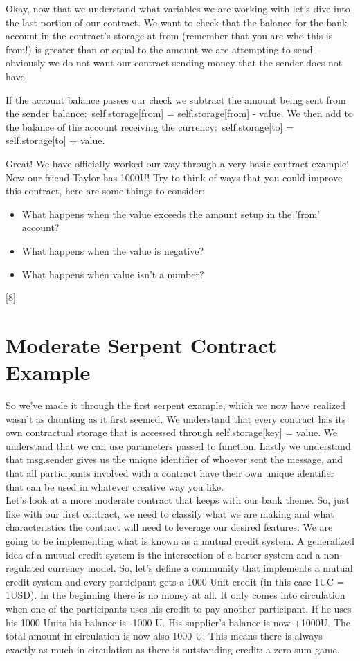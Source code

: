 \documentclass[12pt]{article}
\begin{document}
Okay, now that we understand what variables we are working with let's dive into the last portion of our contract. We want to check that the balance for the bank account in the contract's storage at from (remember that you are who this is from!) is greater than or equal to the amount we are attempting to send - obviously we do not want our contract sending money that the sender does not have.

If the account balance passes our check we subtract the amount being sent from the sender balance: self.storage[from] = self.storage[from] - value. We then add to the balance of the account receiving the currency: self.storage[to] = self.storage[to] + value.

Great! We have officially worked our way through a very basic contract example! Now our friend Taylor has 1000U! Try to think of ways that you could improve this contract, here are some things to consider:

\begin{itemize}
\item What happens when the value exceeds the amount setup in the 'from' account?
\item What happens when the value is negative?
\item What happens when value isn't a number?
\end{itemize}

[8]

\section{Moderate Serpent Contract Example}

	So we've made it through the first serpent example, which we now have realized wasn't as daunting as it first seemed. We understand that every contract has its own contractual storage that is accessed through self.storage[key] = value. We understand that we can use parameters passed to function. Lastly we understand that msg.sender gives us the unique identifier of whoever sent the message, and that all participants involved with a contract have their own unique identifier that can be used in whatever creative way you like. \\

Let's look at a more moderate contract that keeps with our bank theme. So, just like with our first contract, we need to classify what we are making and what characteristics the contract will need to leverage our desired features. We are going to be implementing what is known as a mutual credit system. A generalized idea of a mutual credit system is the intersection of a barter system and a non-regulated currency model. So, let's define a community that implements a mutual credit system and every participant gets a 1000 Unit credit (in this case 1UC = 1USD). In the beginning there is no money at all. It only comes into circulation when one of the participants uses his credit to pay another participant. If he uses his 1000 Units his balance is -1000 U. His supplier's balance is now +1000U. The total amount in circulation is now also 1000 U. This means there is always exactly as much in circulation as there is outstanding credit: a zero sum game.
\end{document}
